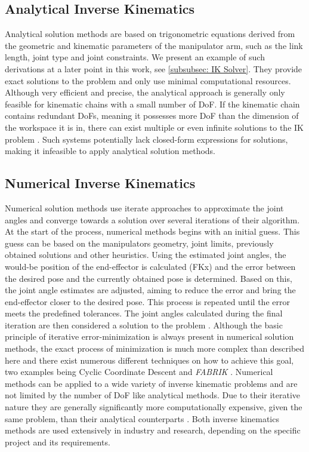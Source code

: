 \subsection{Analytical Inverse Kinematics}
Analytical solution methods are based on trigonometric equations derived from the geometric and kinematic parameters of the manipulator arm, such as the link length, joint type and joint constraints.
We present an example of such derivations at a later point in this work, see \ref{subsubsec: IK Solver}.
They provide exact solutions to the problem and only use minimal computational resources.
Although very efficient and precise, the analytical approach is generally only feasible for kinematic chains with a small number of DoF.
If the kinematic chain contains redundant DoFs, meaning it possesses more DoF than the dimension of the workspace it is in, there can exist multiple or even infinite solutions to the IK problem \parencite{inverseKinematicsIllinois}.
Such systems potentially lack closed-form expressions for solutions, making it infeasible to apply analytical solution methods.

\subsection{Numerical Inverse Kinematics}
Numerical solution methods use iterate approaches to approximate the joint angles and converge towards a solution over several iterations of their algorithm.
At the start of the process, numerical methods begins with an initial guess.
This guess can be based on the manipulators geometry, joint limits, previously obtained solutions and other heuristics.
Using the estimated joint angles, the would-be position of the end-effector is calculated (FKx) and the error between the desired pose and the currently obtained pose is determined.
Based on this, the joint angle estimates are adjusted, aiming to reduce the error and bring the end-effector closer to the desired pose.
This process is repeated until the error meets the predefined tolerances.
The joint angles calculated during the final iteration are then considered a solution to the problem \parencite{inverseKinematicsIllinois}.
Although the basic principle of iterative error-minimization is always present in numerical solution methods, the exact process of minimization is much more complex than described here and there exist numerous different techniques on how to achieve this goal, two examples being Cyclic Coordinate Descent \parencite{inverseKinematicsIllinois} and \textit{FABRIK} \parencite{AristidouFABRIK}. 
Numerical methods can be applied to a wide variety of inverse kinematic problems and are not limited by the number of DoF like analytical methods.
Due to their iterative nature they are generally significantly more computationally expensive, given the same problem, than their analytical counterparts \parencite{aristidou2018inverse}.
Both inverse kinematics methods are used extensively in industry and research, depending on the specific project and its requirements.


